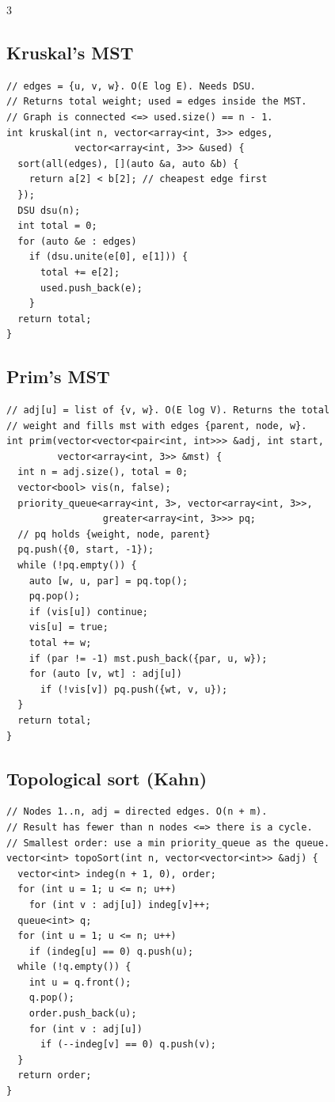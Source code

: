 \documentclass[8pt, a4paper]{article}
\begin{document}
\begin{multicols*}{3}
\subsection{Kruskal's MST}
\begin{lstlisting}
// edges = {u, v, w}. O(E log E). Needs DSU.
// Returns total weight; used = edges inside the MST.
// Graph is connected <=> used.size() == n - 1.
int kruskal(int n, vector<array<int, 3>> edges,
            vector<array<int, 3>> &used) {
  sort(all(edges), [](auto &a, auto &b) {
    return a[2] < b[2]; // cheapest edge first
  });
  DSU dsu(n);
  int total = 0;
  for (auto &e : edges)
    if (dsu.unite(e[0], e[1])) {
      total += e[2];
      used.push_back(e);
    }
  return total;
}
\end{lstlisting}
\subsection{Prim's MST}
\begin{lstlisting}
// adj[u] = list of {v, w}. O(E log V). Returns the total
// weight and fills mst with edges {parent, node, w}.
int prim(vector<vector<pair<int, int>>> &adj, int start,
         vector<array<int, 3>> &mst) {
  int n = adj.size(), total = 0;
  vector<bool> vis(n, false);
  priority_queue<array<int, 3>, vector<array<int, 3>>,
                 greater<array<int, 3>>> pq;
  // pq holds {weight, node, parent}
  pq.push({0, start, -1});
  while (!pq.empty()) {
    auto [w, u, par] = pq.top();
    pq.pop();
    if (vis[u]) continue;
    vis[u] = true;
    total += w;
    if (par != -1) mst.push_back({par, u, w});
    for (auto [v, wt] : adj[u])
      if (!vis[v]) pq.push({wt, v, u});
  }
  return total;
}
\end{lstlisting}
\subsection{Topological sort (Kahn)}
\begin{lstlisting}
// Nodes 1..n, adj = directed edges. O(n + m).
// Result has fewer than n nodes <=> there is a cycle.
// Smallest order: use a min priority_queue as the queue.
vector<int> topoSort(int n, vector<vector<int>> &adj) {
  vector<int> indeg(n + 1, 0), order;
  for (int u = 1; u <= n; u++)
    for (int v : adj[u]) indeg[v]++;
  queue<int> q;
  for (int u = 1; u <= n; u++)
    if (indeg[u] == 0) q.push(u);
  while (!q.empty()) {
    int u = q.front();
    q.pop();
    order.push_back(u);
    for (int v : adj[u])
      if (--indeg[v] == 0) q.push(v);
  }
  return order;
}
\end{lstlisting}

\end{multicols*}
\end{document}
